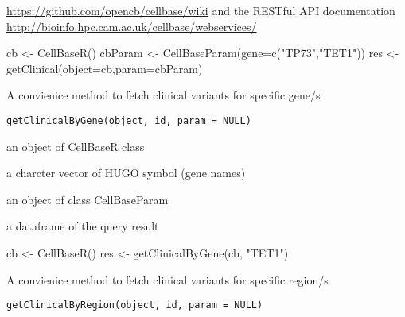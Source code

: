 \documentclass[letterpaper]{book}
\begin{document}
%
\begin{SeeAlso}\relax
\url{https://github.com/opencb/cellbase/wiki} 
and the RESTful API documentation 
\url{http://bioinfo.hpc.cam.ac.uk/cellbase/webservices/}
\end{SeeAlso}
%
\begin{Examples}
\begin{ExampleCode}
   cb <- CellBaseR()
   cbParam <- CellBaseParam(gene=c("TP73","TET1"))
   res <- getClinical(object=cb,param=cbParam)
\end{ExampleCode}
\end{Examples}
%
\begin{Description}\relax
A convienice method to fetch clinical variants for specific gene/s
\end{Description}
%
\begin{Usage}
\begin{verbatim}
getClinicalByGene(object, id, param = NULL)
\end{verbatim}
\end{Usage}
%
\begin{Arguments}
\begin{ldescription}
\item[\code{object}] an object of CellBaseR class

\item[\code{id}] a charcter vector of HUGO symbol (gene names)

\item[\code{param}] an object of class CellBaseParam
\end{ldescription}
\end{Arguments}
%
\begin{Value}
a dataframe of the query result
\end{Value}
%
\begin{Examples}
\begin{ExampleCode}
cb <- CellBaseR()
res <- getClinicalByGene(cb, "TET1")
\end{ExampleCode}
\end{Examples}
%
\begin{Description}\relax
A convienice method to fetch clinical variants for specific region/s
\end{Description}
%
\begin{Usage}
\begin{verbatim}
getClinicalByRegion(object, id, param = NULL)
\end{verbatim}
\end{Usage}
\end{document}
